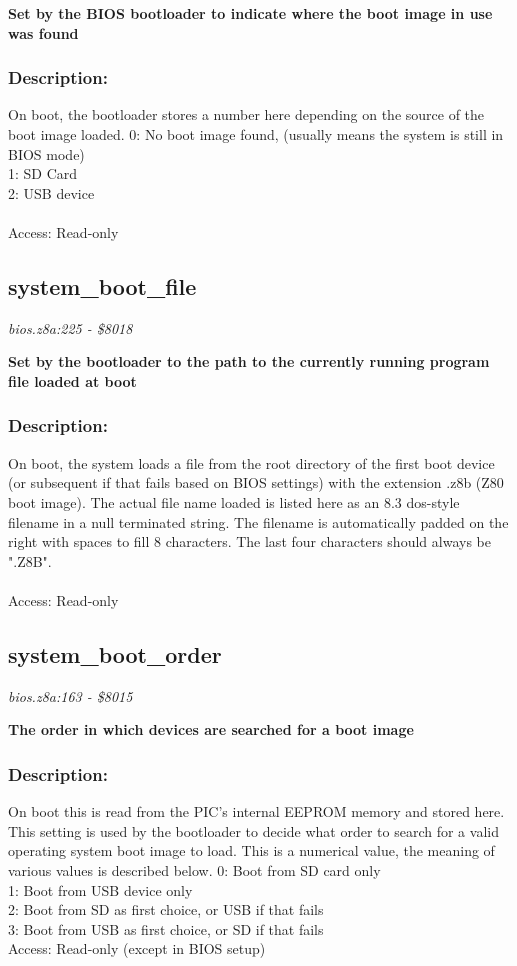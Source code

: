 \noindent
\textbf{Set by the BIOS bootloader to indicate where the boot image in use was found}

\subsubsection{Description:}
 On boot, the bootloader stores a number here depending on the source of the boot image loaded. 0: No boot image found, (usually means the system is still in BIOS mode)\\ 1: SD Card\\ 2: USB device\\\\ Access: Read-only

\subsection{system\_boot\_file}
\textit{bios.z8a:225 - \$8018}

\noindent
\textbf{Set by the bootloader to the path to the currently running program file loaded at boot}

\subsubsection{Description:}
 On boot, the system loads a file from the root directory of the first boot device (or subsequent if that fails based on BIOS settings) with the extension .z8b (Z80 boot image).  The actual file name loaded is listed here as an 8.3 dos-style filename in a null terminated string.  The filename is automatically padded on the right with spaces to fill 8 characters.  The last four characters should always be ".Z8B".\\\\ Access: Read-only

\subsection{system\_boot\_order}
\textit{bios.z8a:163 - \$8015}

\noindent
\textbf{The order in which devices are searched for a boot image}

\subsubsection{Description:}
 On boot this is read from the PIC's internal EEPROM memory and stored here. This setting is used by the bootloader to decide what order to search for a valid operating system boot image to load.  This is a numerical value, the meaning of various values is described below. 0: Boot from SD card only\\ 1: Boot from USB device only\\ 2: Boot from SD as first choice, or USB if that fails\\ 3: Boot from USB as first choice, or SD if that fails\\ Access: Read-only (except in BIOS setup)

